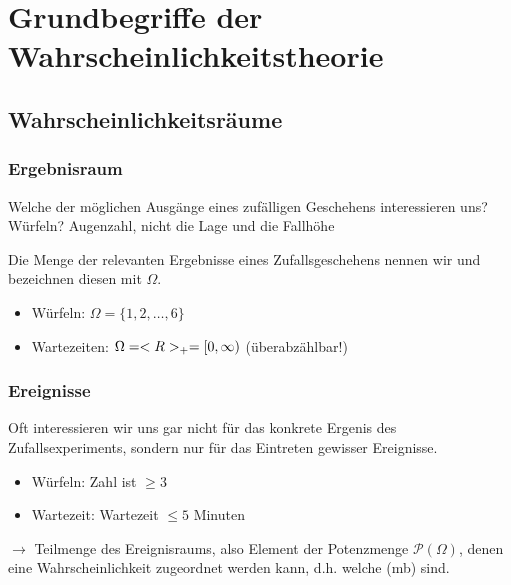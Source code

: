 \chapter{Grundbegriffe der Wahrscheinlichkeitstheorie}

\section{Wahrscheinlichkeitsräume}

\subsection*{Ergebnisraum}

Welche der möglichen Ausgänge eines zufälligen Geschehens interessieren uns?\\
Würfeln? Augenzahl, nicht die Lage und die Fallhöhe

\begin{definition}[Ergebnisraum]
	Die Menge der relevanten Ergebnisse eines Zufallsgeschehens nennen wir  und bezeichnen diesen mit $\Omega$.
\end{definition}

\begin{*example}
	\begin{itemize}
		\item Würfeln: $\Omega = \{1,2, \dots, 6\}$
		\item Wartezeiten: $\Omega = <R>_{+} = [0, \infty)$ (überabzählbar!)
	\end{itemize}
\end{*example}

\subsection*{Ereignisse}

Oft interessieren wir uns gar nicht für das konkrete Ergenis des Zufallsexperiments, sondern nur für das Eintreten gewisser Ereignisse.
\begin{*example}
	\begin{itemize}
		\item Würfeln: Zahl ist $\ge 3$
		\item Wartezeit: Wartezeit $\le 5$ Minuten
	\end{itemize}
\end{*example}

$\longrightarrow$ Teilmenge des Ereignisraums, also Element der Potenzmenge $\mathscr{P}(\Omega)$, denen eine Wahrscheinlichkeit zugeordnet werden kann, d.h. welche  (mb) sind.

